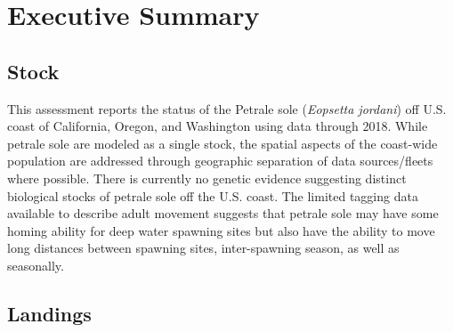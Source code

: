 \documentclass[12pt,]{article}
\begin{document}
{
\setcounter{tocdepth}{4}
\tableofcontents
}
\setlength{\parskip}{5mm plus1mm minus1mm} \pagebreak

\setcounter{page}{1} \renewcommand{\thefigure}{\alph{figure}}
\renewcommand{\thetable}{\alph{table}}

\section*{Executive Summary}\label{executive-summary}

\subsection*{Stock}\label{stock}

This assessment reports the status of the Petrale sole
(\emph{Eopsetta jordani}) off U.S. coast of California, Oregon, and
Washington using data through 2018. While petrale sole are modeled as a
single stock, the spatial aspects of the coast-wide population are
addressed through geographic separation of data sources/fleets where
possible. There is currently no genetic evidence suggesting distinct
biological stocks of petrale sole off the U.S. coast. The limited
tagging data available to describe adult movement suggests that petrale
sole may have some homing ability for deep water spawning sites but also
have the ability to move long distances between spawning sites,
inter-spawning season, as well as seasonally.

\subsection*{Landings}\label{landings}
\end{document}
